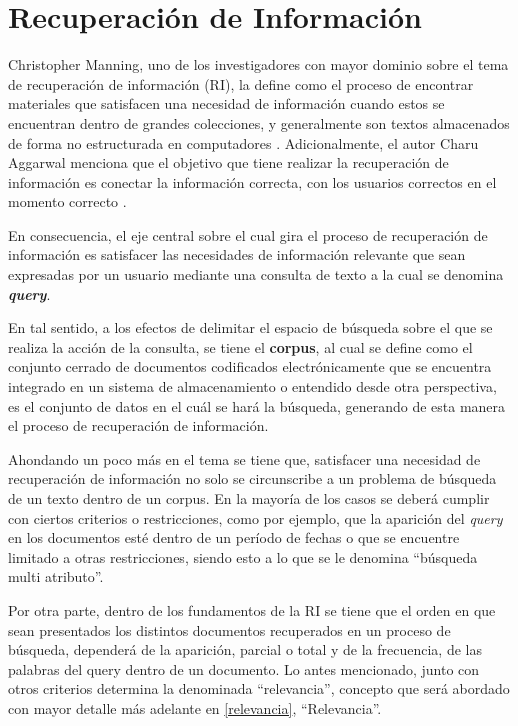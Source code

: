 \documentclass[
  12pt,
  openany]{book}
\begin{document}
\hypertarget{infret}{%
\section{Recuperación de Información}\label{infret}}

Christopher Manning, uno de los investigadores con mayor dominio sobre el tema de recuperación de información (RI), la define como el proceso de encontrar materiales que satisfacen una necesidad de información cuando estos se encuentran dentro de grandes colecciones, y generalmente son textos almacenados de forma no estructurada en computadores \citep{manning2008}. Adicionalmente, el autor Charu Aggarwal menciona que el objetivo que tiene realizar la recuperación de información es conectar la información correcta, con los usuarios correctos en el momento correcto \citep{miningt2012}.

En consecuencia, el eje central sobre el cual gira el proceso de recuperación de información es satisfacer las necesidades de información relevante que sean expresadas por un usuario mediante una consulta de texto a la cual se denomina \textbf{\emph{query}}.

En tal sentido, a los efectos de delimitar el espacio de búsqueda sobre el que se realiza la acción de la consulta, se tiene el \textbf{corpus}, al cual se define como el conjunto cerrado de documentos codificados electrónicamente que se encuentra integrado en un sistema de almacenamiento \citep{martiaurora} o entendido desde otra perspectiva, es el conjunto de datos en el cuál se hará la búsqueda, generando de esta manera el proceso de recuperación de información.

Ahondando un poco más en el tema se tiene que, satisfacer una necesidad de recuperación de información no solo se circunscribe a un problema de búsqueda de un texto dentro de un corpus. En la mayoría de los casos se deberá cumplir con ciertos criterios o restricciones, como por ejemplo, que la aparición del \emph{query} en los documentos esté dentro de un período de fechas o que se encuentre limitado a otras restricciones, siendo esto a lo que se le denomina ``búsqueda multi atributo''.

Por otra parte, dentro de los fundamentos de la RI se tiene que el orden en que sean presentados los distintos documentos recuperados en un proceso de búsqueda, dependerá de la aparición, parcial o total y de la frecuencia, de las palabras del query dentro de un documento. Lo antes mencionado, junto con otros criterios determina la denominada ``relevancia'', concepto que será abordado con mayor detalle más adelante en \ref{relevancia}, ``Relevancia''.
\end{document}
